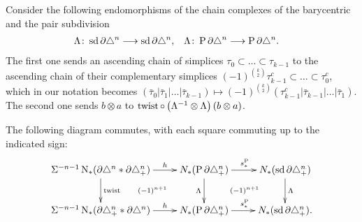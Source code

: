 Consider the following endomorphisms of the chain complexes of the barycentric and the pair subdivision
\begin{align*}
	\Lambda\colon \operatorname{sd} \partial\triangle^n&\longrightarrow \operatorname{sd} \partial\triangle^n,
	&
	\Lambda\colon \operatorname{P} \partial\triangle^n&\longrightarrow \operatorname{P} \partial\triangle^n.
\end{align*}
The first one sends an ascending chain of simplices $\tau_0\subset \ldots\subset \tau_{k-1}$ to the ascending chain of their complementary simplices $(-1)^{\binom{k}{2}} \tau_{k-1}^c\subset \ldots\subset\tau_0^c$, which in our notation becomes $(\bar{\tau}_0|\bar{\tau}_1|\ldots|\bar{\tau}_{k-1})\mapsto (-1)^{\binom{k}{2}}(\tau_{k-1}^c|\bar{\tau}_{k-1}|\ldots|\bar{\tau}_1)$. The second one sends $b\otimes a$ to $\operatorname{twist}\circ \left(\Lambda^{-1}\otimes \Lambda\right)(b\otimes a)$.
\begin{lemma} The following diagram commutes, with each square commuting up to the indicated sign:
	\begin{equation}\label{diag:newdiag}
		\xymatrix{
			\susp{-n-1}\chains(\partial \simplex^n*\partial\asimplex^n)\ar[r]^-h\ar[d]^{\twist} \ar@{}[dr] | {(-1)^{n+1}}&\cadenas(\Psd \partial \asimplex^n) \ar[r]^{s_*^{\Psd}}\ar[d]_{\alex}  \ar@{}[dr] | {(-1)^{n+1}}& \cadenas(\sd \partial \asimplex^n)\ar[d]^{\alex}\\
			\susp{-n-1}\chains(\partial \asimplex^n*\partial\simplex^n)\ar[r]^-h &\cadenas(\Psd \partial \asimplex^n) \ar[r]^{s_*^{\Psd}}& \cadenas(\sd \partial \asimplex^n).
		}
	\end{equation}
\end{lemma}

